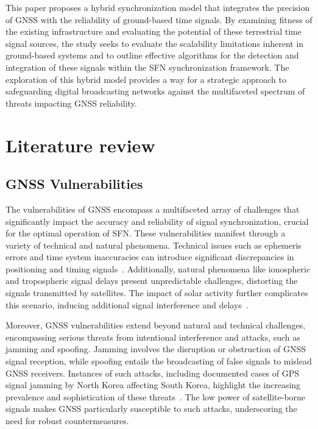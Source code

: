 \documentclass[conference]{IEEEtran}
\begin{document}
This paper proposes a hybrid synchronization model that integrates the
precision of GNSS with the reliability of ground-based time signals. By
examining fitness of the existing infrastructure and evaluating the potential
of these terrestrial time signal sources, the study seeks to evaluate the
scalability limitations inherent in ground-based systems and to outline
effective algorithms for the detection and integration of these signals within
the SFN synchronization framework. The exploration of this hybrid model
provides a way for a strategic approach to safeguarding digital broadcasting
networks against the multifaceted spectrum of threats impacting GNSS
reliability.

\section{Literature review}

\subsection{GNSS Vulnerabilities}\label{gnss-vuln}

The vulnerabilities of GNSS encompass a multifaceted array of challenges that
significantly impact the accuracy and reliability of signal synchronization,
crucial for the optimal operation of SFN. These vulnerabilities manifest
through a variety of technical and natural phenomena. Technical issues such as
ephemeris errors and time system inaccuracies can introduce significant
discrepancies in positioning and timing signals~\cite{dempster2001vulnerable}.
Additionally, natural phenomena like ionospheric and tropospheric signal delays
present unpredictable challenges, distorting the signals transmitted by
satellites. The impact of solar activity further complicates this scenario,
inducing additional signal interference and
delays~\cite{infrastructure2001vulnerability}.

Moreover, GNSS vulnerabilities extend beyond natural and technical challenges,
encompassing serious threats from intentional interference and attacks, such as
jamming and spoofing. Jamming involves the disruption or obstruction of GNSS
signal reception, while spoofing entails the broadcasting of false signals to
mislead GNSS receivers. Instances of such attacks, including documented cases
of GPS signal jamming by North Korea affecting South Korea, highlight the
increasing prevalence and sophistication of these threats~\cite{SeoKim2013}.
The low power of satellite-borne signals makes GNSS particularly susceptible to
such attacks, underscoring the need for robust countermeasures.
\end{document}
